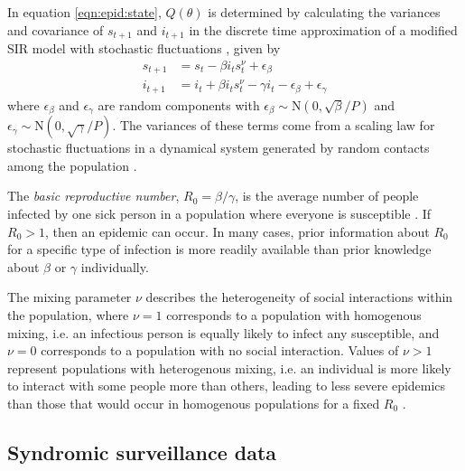 In equation \eqref{eqn:epid:state}, $Q(\theta)$ is determined by calculating the variances and covariance of $s_{t+1}$ and $i_{t+1}$ in the discrete time approximation of a modified SIR model with stochastic fluctuations \citep{herwaarden1995stochepid, dangerfield2009stochepid, anderson2004sars}, given by
\begin{align*}
s_{t+1} &= s_t - \beta i_ts^\nu_t + \epsilon_\beta \\
i_{t+1} &= i_t + \beta i_ts^\nu_t - \gamma i_t - \epsilon_\beta + \epsilon_\gamma
\end{align*}
where $\epsilon_\beta$ and $\epsilon_\gamma$ are random components with $\epsilon_\beta \sim \mbox{N}(0, \sqrt{\beta} / P)$ and $\epsilon_\gamma \sim \mbox{N}(0, \sqrt{\gamma} / P)$. The variances of these terms come from a scaling law for stochastic fluctuations in a dynamical system generated by random contacts among the population \citep{ovaskainen2010extinction, herwaarden1995stochepid, dangerfield2009stochepid, skvortsov2012monitoring}.

The \emph{basic reproductive number}, $R_0 = \beta / \gamma$, is the average number of people infected by one sick person in a population where everyone is susceptible \citep{heff2005repratio}. If $R_0 > 1$, then an epidemic can occur. In many cases, prior information about $R_0$ for a specific type of infection is more readily available than prior knowledge about $\beta$ or $\gamma$ individually.

The mixing parameter $\nu$ describes the heterogeneity of social interactions within the population, where $\nu = 1$ corresponds to a population with homogenous mixing, i.e. an infectious person is equally likely to infect any susceptible, and $\nu = 0$ corresponds to a population with no social interaction. Values of $\nu > 1$ represent populations with heterogenous mixing, i.e. an individual is more likely to interact with some people more than others, leading to less severe epidemics than those that would occur in homogenous populations for a fixed $R_0$ \citep{stroud2006powerlaw, novozhilov2008hetero}.

\subsection{Syndromic surveillance data \label{sec:epid:obs}}

